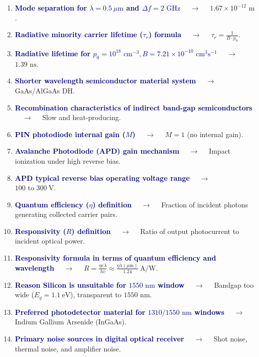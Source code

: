 \documentclass[11pt,a4paper]{article}
\begin{document}
\begin{enumerate}[label=\arabic*., leftmargin=*, labelsep=0.8em, itemsep=0.35em, parsep=0.1em, topsep=0.2em]
  \item \textcolor{darkblue}{\textbf{Mode separation for $\lambda = 0.5\ \mu\text{m}$ and $\Delta f = 2\text{ GHz}$}} $\quad\to\quad$ $1.67 \times 10^{-12}\text{ m}$.
  \item \textcolor{darkblue}{\textbf{Radiative minority carrier lifetime ($\tau_r$) formula}} $\quad\to\quad$ $\tau_r = \frac{1}{B \cdot p_0}$.
  \item \textcolor{darkblue}{\textbf{Radiative lifetime for $p_0=10^{18}\text{ cm}^{-3}, B=7.21 \times 10^{-10}\text{ cm}^3\text{s}^{-1}$}} $\quad\to\quad$ $1.39\text{ ns}$.
  \item \textcolor{darkblue}{\textbf{Shorter wavelength semiconductor material system}} $\quad\to\quad$ GaAs/AlGaAs DH.
  \item \textcolor{darkblue}{\textbf{Recombination characteristics of indirect band-gap semiconductors}} $\quad\to\quad$ Slow and heat-producing.
  \item \textcolor{darkblue}{\textbf{PIN photodiode internal gain ($M$)}} $\quad\to\quad$ $M = 1$ (no internal gain).
  \item \textcolor{darkblue}{\textbf{Avalanche Photodiode (APD) gain mechanism}} $\quad\to\quad$ Impact ionization under high reverse bias.
  \item \textcolor{darkblue}{\textbf{APD typical reverse bias operating voltage range}} $\quad\to\quad$ $100 \text{ to } 300\ \text{V}$.
  \item \textcolor{darkblue}{\textbf{Quantum efficiency ($\eta$) definition}} $\quad\to\quad$ Fraction of incident photons generating collected carrier pairs.
  \item \textcolor{darkblue}{\textbf{Responsivity ($R$) definition}} $\quad\to\quad$ Ratio of output photocurrent to incident optical power.
  \item \textcolor{darkblue}{\textbf{Responsivity formula in terms of quantum efficiency and wavelength}} $\quad\to\quad$ $R = \frac{\eta e \lambda}{hc} \approx \frac{\eta \lambda(\mu\text{m})}{1.24}\ \text{A/W}$.
  \item \textcolor{darkblue}{\textbf{Reason Silicon is unsuitable for $1550\text{ nm}$ window}} $\quad\to\quad$ Bandgap too wide ($E_g=1.1\ \text{eV}$), transparent to $1550\text{ nm}$.
  \item \textcolor{darkblue}{\textbf{Preferred photodetector material for $1310/1550\text{ nm}$ windows}} $\quad\to\quad$ Indium Gallium Arsenide (InGaAs).
  \item \textcolor{darkblue}{\textbf{Primary noise sources in digital optical receiver}} $\quad\to\quad$ Shot noise, thermal noise, and amplifier noise.

\end{enumerate}
\end{document}
